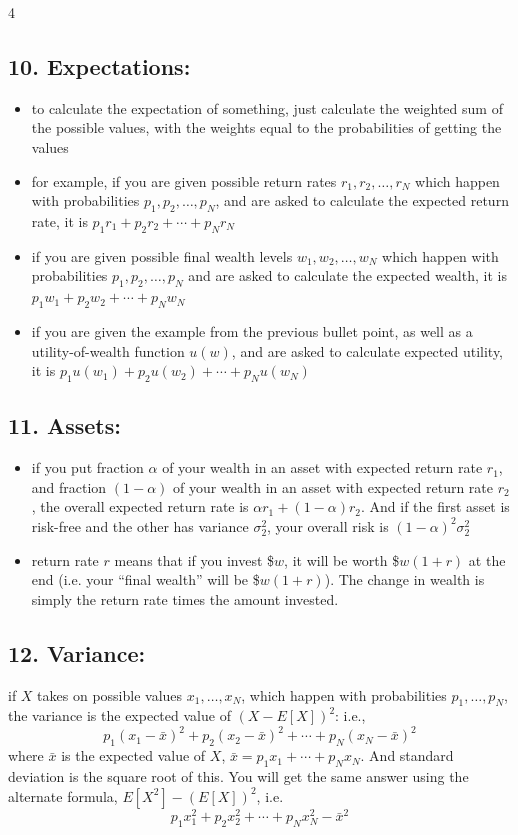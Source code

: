 \documentclass[8pt,landscape]{extarticle}
\begin{document}
\begin{multicols}{4}
\subsection*{10. Expectations:}
\begin{itemize}[leftmargin=*,noitemsep,topsep=0pt]
\item to calculate the expectation of something, just calculate the weighted sum of the possible values, with the weights equal to the probabilities of getting the values
\item for example, if you are given possible return rates $r_1,r_2,\ldots,r_N$ which happen with probabilities $p_1,p_2,\ldots,p_N$, and are asked to calculate the expected return rate, it is $p_1 r_1 + p_2 r_2 + \cdots + p_N r_N$
\item if you are given possible final wealth levels $w_1,w_2,\ldots,w_N$ which happen with probabilities $p_1,p_2,\ldots,p_N$ and are asked to calculate the expected wealth, it is $p_1 w_1 + p_2 w_2 + \cdots + p_N w_N$
\item if you are given the example from the previous bullet point, as well as a utility-of-wealth function $u(w)$, and are asked to calculate expected utility, it is $p_1 u(w_1) + p_2 u(w_2) + \cdots + p_N u(w_N)$
\end{itemize}

\subsection*{11. Assets:}
\begin{itemize}[leftmargin=*,noitemsep,topsep=0pt]
\item if you put fraction $\alpha$ of your wealth in an asset with expected return rate $r_1$, and fraction $(1-\alpha)$ of your wealth in an asset with expected return rate $r_2$, the overall expected return rate is $\alpha r_1 + (1-\alpha)r_2$. And if the first asset is risk-free and the other has variance $\sigma_2^2$, your overall risk is $(1-\alpha)^2 \sigma_2^2$
\item return rate $r$ means that if you invest \$$w$, it will be worth \$$w(1+r)$ at the end (i.e. your ``final wealth'' will be \$$w(1+r)$). The change in wealth is simply the return rate times the amount invested.
\end{itemize}

\subsection*{12. Variance:}
if $X$ takes on possible values $x_1,\ldots,x_N$, which happen with probabilities $p_1,\ldots,p_N$, the variance is the expected value of $(X - E[X])^2$: i.e.,
$$p_1(x_1 - \bar{x})^2 + p_2(x_2 - \bar{x})^2 + \cdots + p_N(x_N - \bar{x})^2$$
where $\bar{x}$ is the expected value of $X$, $\bar{x} = p_1 x_1 + \cdots + p_N x_N$. And standard deviation is the square root of this. You will get the same answer using the alternate formula, $E[X^2] - (E[X])^2$, i.e.
$$p_1 x_1^2 + p_2 x_2^2 + \cdots + p_N x_N^2 - \bar{x}^2$$


\end{multicols}
\end{document}
